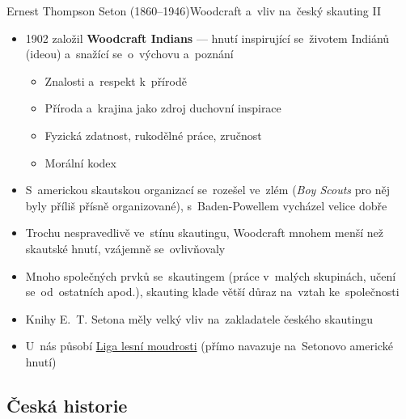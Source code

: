 \documentclass[compress, xelatex, 11pt, xcolor=dvipsnames, aspectratio=169, url={hyphens, lowtilde}]{beamer}
\begin{document}
\begin{frame}{Ernest Thompson Seton (1860--1946)}{Woodcraft a~vliv na~český skauting II}
	\begin{itemize}
		\item 1902 založil \textbf{Woodcraft Indians} --- hnutí inspirující se~životem Indiánů (ideou) a~snažící se~o~výchovu a~poznání
		\begin{itemize}
			\item Znalosti a~respekt k~přírodě
			\item Příroda a~krajina jako zdroj duchovní inspirace
			\item Fyzická zdatnost, rukodělné práce, zručnost
			\item Morální kodex
		\end{itemize}
		\item S~americkou skautskou organizací se~rozešel ve~zlém (\textit{Boy Scouts} pro něj byly příliš přísně organizované), s~Baden-Powellem vycházel velice dobře
		\item Trochu nespravedlivě ve~stínu skautingu, Woodcraft mnohem menší než skautské hnutí, vzájemně se~ovlivňovaly
		\item Mnoho společných prvků se~skautingem (práce v~malých skupinách, učení se~od~ostatních apod.), skauting klade větší důraz na~vztah ke~společnosti
		\item Knihy E.~T. Setona měly velký vliv na~zakladatele českého skautingu
		\item U~nás působí \href{https://www.woodcraft.cz/}{Liga lesní moudrosti} (přímo navazuje na~Setonovo americké hnutí)
	\end{itemize}
\end{frame}

\subsection{Česká historie}
\end{document}
